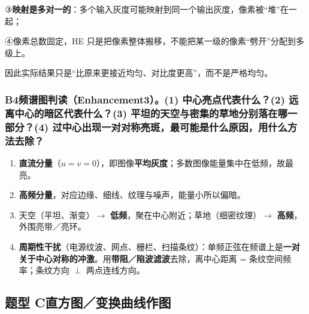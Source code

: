 ③\textbf{映射是多对一的}：多个输入灰度可能映射到同一个输出灰度，像素被“堆”在一起；

④像素总数固定，HE 只是把像素整体搬移，不能把某一级的像素“劈开”分配到多级上。

因此实际结果只是“比原来更接近均匀、对比度更高”，而不是严格均匀。

\subsubsection*{B4\quad 频谱图判读（Enhancement3）。(1) 中心亮点代表什么？(2) 远离中心的暗区代表什么？(3) 平坦的天空与密集的草地分别落在哪一部分？(4) 过中心出现一对对称亮斑，最可能是什么原因，用什么方法去除？}
\begin{enumerate}[label=(\arabic*),leftmargin=*]
\item \textbf{直流分量}（$u=v=0$），即图像\textbf{平均灰度}；多数图像能量集中在低频，故最亮。
\item \textbf{高频分量}，对应边缘、细线、纹理与噪声，能量小所以偏暗。
\item 天空（平坦、渐变）$\to$ \textbf{低频}，聚在中心附近；草地（细密纹理）$\to$ \textbf{高频}，外围亮带／亮环。
\item \textbf{周期性干扰}（电源纹波、网点、栅栏、扫描条纹）：单频正弦在频谱上是\textbf{一对关于中心对称的冲激}。用\textbf{带阻／陷波滤波}去除，离中心距离 = 条纹空间频率；条纹方向 $\perp$ 两点连线方向。
\end{enumerate}

\subsection*{题型 C\quad 直方图／变换曲线作图}

